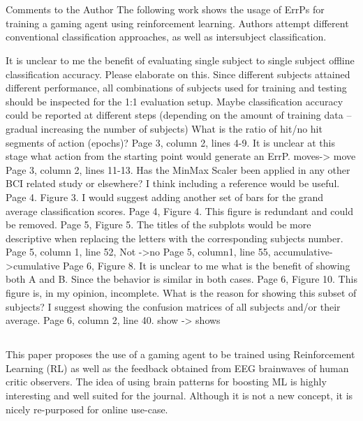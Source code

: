 \documentclass[journal,onecolumn,12pt]{IEEEtran}
\begin{document}
\section*{}

Comments to the Author
The following work shows the usage of ErrPs for training a gaming agent using reinforcement learning. Authors attempt different conventional classification approaches, as well as intersubject classification.

It is unclear to me the benefit of evaluating single subject to single subject offline classification accuracy. Please elaborate on this. Since different subjects attained different performance, all combinations of subjects used for training and testing should be inspected for the 1:1 evaluation setup. Maybe classification accuracy could be reported at different steps (depending on the amount of training data – gradual increasing the number of subjects)
What is the ratio of hit/no hit segments of action (epochs)?
Page 3, column 2, lines 4-9. It is unclear at this stage what action from the starting point would generate an ErrP.
moves-> move
Page 3, column 2, lines 11-13. Has the MinMax Scaler been applied in any other BCI related study or elsewhere? I think including a reference would be useful.
Page 4. Figure 3. I would suggest adding another set of bars for the grand average classification scores.
Page 4, Figure 4. This figure is redundant and could be removed.
Page 5, Figure 5. The titles of the subplots would be more descriptive when replacing the letters with the corresponding subjects number.
Page 5, column 1, line 52, Not ->no
Page 5, column1, line 55, accumulative->cumulative
Page 6, Figure 8. It is unclear to me what is the benefit of showing both A and B. Since the behavior is similar in both cases.
Page 6, Figure 10. This figure is, in my opinion, incomplete. What is the reason for showing this subset of subjects? I suggest showing the confusion matrices of all subjects and/or their average.
Page 6, column 2, line 40. show -> shows

\subsection*{}

This paper proposes the use of a gaming agent to be trained using Reinforcement Learning (RL) as well as the feedback obtained from EEG brainwaves of human critic observers. The idea of using brain patterns for boosting ML is highly interesting and well suited for the journal. Although it is not a new concept, it is nicely re-purposed for online use-case.
\end{document}
